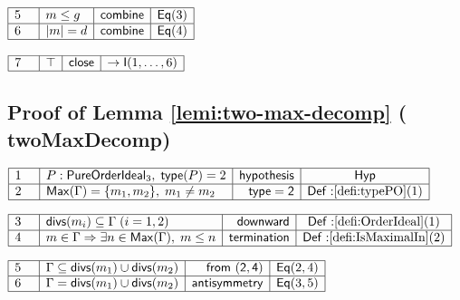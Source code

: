 \documentclass[11pt,reqno]{amsart}
\begin{document}
\nointerlineskip\noindent$%
\begin{array}{|m{0.5cm}|l|r|c|}
\hline
5 & m\le g & \mathsf{combine} & \mathsf{Eq}(3) \\ \hline
6 & |m|=d & \mathsf{combine} & \mathsf{Eq}(4) \\ \hline
\end{array}%
$

\nointerlineskip\noindent$%
\begin{array}{|m{0.5cm}|l|r|c|}
\hline
7 & \top & \mathsf{close} & \to\mathsf{I}(1,\dots,6) \\ \hline
\end{array}%
$

\medskip


\subsection*{Proof of Lemma \protect\ref{lemi:two-max-decomp} (\textsf{%
twoMaxDecomp})}

\noindent$%
\begin{array}{|m{0.5cm}|l|r|c|}
\hline
1 & P:\mathsf{PureOrderIdeal}_{3},\;\mathsf{type}(P)=2 & \mathsf{hypothesis}
& \mathsf{Hyp} \\ \hline
2 & \mathsf{Max}(\Gamma)=\{m_{1},m_{2}\},\;m_{1}\ne m_{2} & \mathsf{type=2}
& \mathsf{Def:}\ref{defi:typePO}(1) \\ \hline
\end{array}%
$

\nointerlineskip\noindent$%
\begin{array}{|m{0.5cm}|l|r|c|}
\hline
3 & \mathsf{divs}(m_{i})\subseteq\Gamma\;(i=1,2) & \mathsf{downward} & 
\mathsf{Def:}\ref{defi:OrderIdeal}(1) \\ \hline
4 & m\in\Gamma\Rightarrow\exists n\in\mathsf{Max}(\Gamma),\;m\le n & \mathsf{%
termination} & \mathsf{Def:}\ref{defi:IsMaximalIn}(2) \\ \hline
\end{array}%
$

\nointerlineskip\noindent$%
\begin{array}{|m{0.5cm}|l|r|c|}
\hline
5 & \Gamma\subseteq\mathsf{divs}(m_{1})\cup\mathsf{divs}(m_{2}) & \mathsf{%
from\ (2,4)} & \mathsf{Eq}(2,4) \\ \hline
6 & \Gamma=\mathsf{divs}(m_{1})\cup\mathsf{divs}(m_{2}) & \mathsf{%
antisymmetry} & \mathsf{Eq}(3,5) \\ \hline
\end{array}%
$
\end{document}
